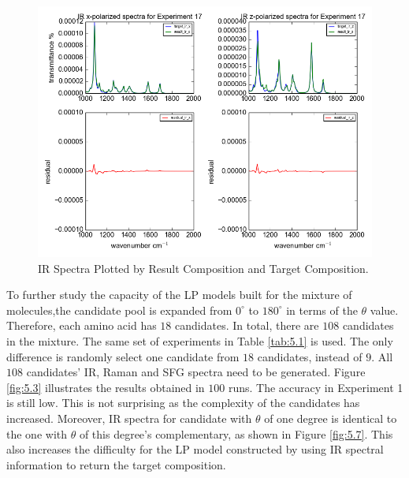 \begin{figure}[!ht] 
\centering
\includegraphics[scale=0.7]{Figures/chapter5_result_target_residual_plotting__ir_result8_run1.png}
\caption{IR Spectra Plotted by Result Composition and Target Composition.} \label{fig:5.2}
\end{figure}

To further study the capacity of the LP models built for the mixture of molecules,the candidate pool is expanded from $0^{\circ}$ to $180^{\circ}$ in terms of the $\theta$ value. Therefore, each amino acid has $18$ candidates. In total, there are $108$ candidates in the mixture. The same set of experiments in Table \ref{tab:5.1} is used. The only difference is randomly select one candidate from $18$ candidates, instead of $9$. All $108$ candidates' IR, Raman and SFG spectra need to be generated. Figure \ref{fig:5.3} illustrates the results obtained in $100$ runs. The accuracy in Experiment 1 is still low. This is not surprising as the complexity of the candidates has increased. Moreover, IR spectra for candidate with $\theta$ of one degree is identical to the one with $\theta$ of this degree's complementary, as shown in Figure \ref{fig:5.7}. This also increases the difficulty for the LP model constructed by using IR spectral information to return the target composition. \\


